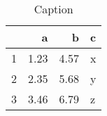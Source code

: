 \begin{table}[ht]
\centering
\begin{tabular}{rrrl}
  \hline
 & a & b & c \\ 
  \hline
1 & 1.23 & 4.57 & x \\ 
  2 & 2.35 & 5.68 & y \\ 
  3 & 3.46 & 6.79 & z \\ 
   \hline
\end{tabular}
\caption{Caption} 
\label{table:df}
\end{table}
